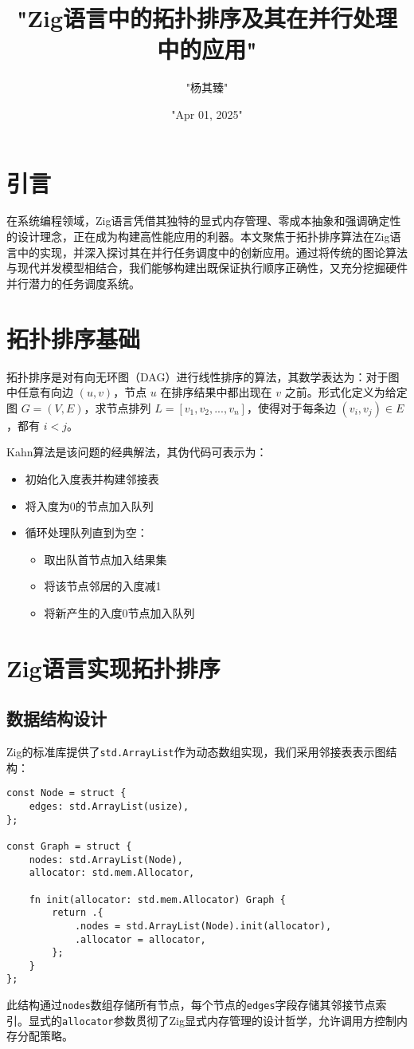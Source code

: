 \title{"Zig语言中的拓扑排序及其在并行处理中的应用"}
\author{"杨其臻"}
\date{"Apr 01, 2025"}
\maketitle
\chapter{引言}
在系统编程领域，Zig语言凭借其独特的显式内存管理、零成本抽象和强调确定性的设计理念，正在成为构建高性能应用的利器。本文聚焦于拓扑排序算法在Zig语言中的实现，并深入探讨其在并行任务调度中的创新应用。通过将传统的图论算法与现代并发模型相结合，我们能够构建出既保证执行顺序正确性，又充分挖掘硬件并行潜力的任务调度系统。\par
\chapter{拓扑排序基础}
拓扑排序是对有向无环图（DAG）进行线性排序的算法，其数学表达为：对于图中任意有向边 $(u, v)$，节点 $u$ 在排序结果中都出现在 $v$ 之前。形式化定义为给定图 $G=(V, E)$，求节点排列 $L = [v_1, v_2, ..., v_n]$，使得对于每条边 $(v_i, v_j) \in E$，都有 $i < j$。\par
Kahn算法是该问题的经典解法，其伪代码可表示为：\par
\begin{itemize}
\item 初始化入度表并构建邻接表
\item 将入度为0的节点加入队列
\item 循环处理队列直到为空：\begin{itemize}
\item 取出队首节点加入结果集
\item 将该节点邻居的入度减1
\item 将新产生的入度0节点加入队列
\end{itemize}

\end{itemize}
\chapter{Zig语言实现拓扑排序}
\section{数据结构设计}
Zig的标准库提供了\verb!std.ArrayList!作为动态数组实现，我们采用邻接表表示图结构：\par
\begin{lstlisting}[language=zig]
const Node = struct {
    edges: std.ArrayList(usize),
};

const Graph = struct {
    nodes: std.ArrayList(Node),
    allocator: std.mem.Allocator,

    fn init(allocator: std.mem.Allocator) Graph {
        return .{
            .nodes = std.ArrayList(Node).init(allocator),
            .allocator = allocator,
        };
    }
};
\end{lstlisting}
此结构通过\verb!nodes!数组存储所有节点，每个节点的\verb!edges!字段存储其邻接节点索引。显式的\verb!allocator!参数贯彻了Zig显式内存管理的设计哲学，允许调用方控制内存分配策略。\par
